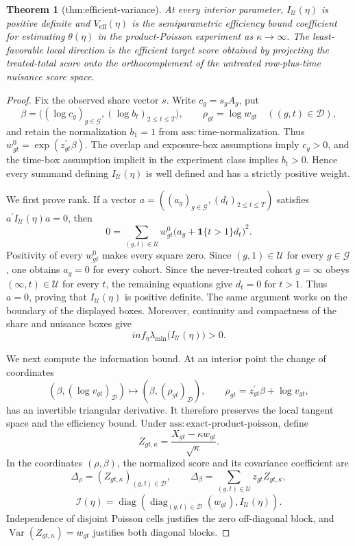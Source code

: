 \documentclass{article}
\newtheorem{theorem}{Theorem}
\begin{document}
\begin{theorem}[thm:efficient-variance]\label{thm:efficient-variance}
At every interior parameter, \(I_{\mathcal U}(\eta)\) is positive definite and \(V_{\mathrm{eff}}(\eta)\) is the semiparametric efficiency bound coefficient for estimating \(\theta(\eta)\) in the product-Poisson experiment as \(\kappa\to\infty\). The least-favorable local direction is the efficient target score obtained by projecting the treated-total score onto the orthocomplement of the untreated row-plus-time nuisance score space.
\end{theorem}
\begin{proof}
Fix the observed share vector \(s\).  Write \(c_g=s_gA_g\), put
\[
 \beta=\bigl((\log c_g)_{g\in\mathcal G},(\log b_t)_{2\leq t\leq T}\bigr),
 \qquad \rho_{gt}=\log w_{gt}\quad ((g,t)\in\mathcal D),
\]
and retain the normalization \(b_1=1\) from
\(\mathrm{ass{:}time\text{-}normalization}\).  Thus
\(w^0_{gt}=\exp(z_{gt}^{\prime}\beta)\).  The overlap and exposure-box
assumptions imply \(c_g>0\), and the time-box assumption implicit in the
experiment class implies \(b_t>0\).  Hence every summand defining
\(I_{\mathcal U}(\eta)\) is well defined and has a strictly positive weight.

We first prove rank.  If a vector
\(a=((a_g)_{g\in\mathcal G},(d_t)_{2\leq t\leq T})\) satisfies
\(a^{\prime}I_{\mathcal U}(\eta)a=0\), then
\[
 0=\sum_{(g,t)\in\mathcal U}w^0_{gt}
       \bigl(a_g+\mathbf 1\{t>1\}d_t\bigr)^2.
\]
Positivity of every \(w^0_{gt}\) makes every square zero.  Since
\((g,1)\in\mathcal U\) for every \(g\in\mathcal G\), one obtains
\(a_g=0\) for every cohort.  Since the never-treated cohort
\(g=\infty\) obeys \((\infty,t)\in\mathcal U\) for every \(t\), the
remaining equations give \(d_t=0\) for \(t>1\).  Thus \(a=0\), proving
that \(I_{\mathcal U}(\eta)\) is positive definite.  The same argument
works on the boundary of the displayed boxes.  Moreover, continuity and
compactness of the share and nuisance boxes give
\[
 inf_{\eta}\lambda_{\min}\bigl(I_{\mathcal U}(\eta)\bigr)>0.
\]

We next compute the information bound.  At an interior point the change of
coordinates
\[
  (\beta,(\log v_{gt})_{\mathcal D})
    \longmapsto (\beta,(\rho_{gt})_{\mathcal D}),
 \qquad
  \rho_{gt}=z_{gt}^{\prime}\beta+\log v_{gt},
\]
has an invertible triangular derivative.  It therefore preserves the local
tangent space and the efficiency bound.  Under
\(\mathrm{ass{:}exact\text{-}product\text{-}poisson}\), define
\[
 Z_{gt,\kappa}=\frac{X_{gt}-\kappa w_{gt}}{\sqrt\kappa}.
\]
In the coordinates \((\rho,\beta)\), the normalized score and its covariance
coefficient are
\[
 \Delta_{\rho}= (Z_{gt,\kappa})_{(g,t)\in\mathcal D},
 \qquad
 \Delta_{\beta}=\sum_{(g,t)\in\mathcal U}z_{gt}Z_{gt,\kappa},
\]
\[
 \mathcal I(\eta)=
 \operatorname{diag}\!\left(
   \operatorname{diag}_{(g,t)\in\mathcal D}(w_{gt}),
   I_{\mathcal U}(\eta)
 \right).
\]
Independence of disjoint Poisson cells justifies the zero off-diagonal
block, and \(\operatorname{Var}(Z_{gt,\kappa})=w_{gt}\) justifies both
diagonal blocks.


\end{proof}
\end{document}
